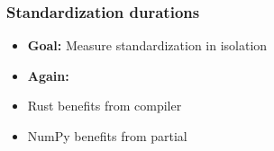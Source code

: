 \documentclass[t,english]{beamer}
\begin{document}
\begin{frame}
  \frametitle{Standardization durations}
  \begin{itemize}
    \item \textbf{Goal:} Measure standardization in isolation
  \end{itemize}
  \begin{itemize}
    \item<3-> \textbf{Again:}
    \item<3-> Rust benefits from compiler
    \item<3->  NumPy benefits from partial
  \end{itemize}
\end{frame}
\end{document}
